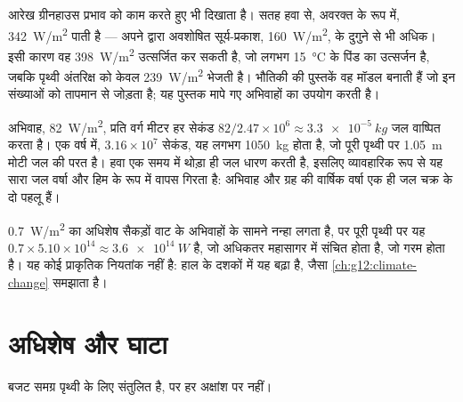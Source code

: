 आरेख ग्रीनहाउस प्रभाव को काम करते हुए भी दिखाता है। सतह हवा से, अवरक्त के रूप में,
\qty{342}{W/m^2} पाती है --- अपने द्वारा अवशोषित सूर्य-प्रकाश, \qty{160}{W/m^2}, के
दुगुने से भी अधिक। इसी कारण वह \qty{398}{W/m^2} उत्सर्जित कर सकती है, जो लगभग
\qty{15}{\degreeCelsius} के पिंड का उत्सर्जन है, जबकि पृथ्वी अंतरिक्ष को
केवल \qty{239}{W/m^2} भेजती है। भौतिकी की पुस्तकें वह मॉडल बनाती हैं जो इन संख्याओं को
तापमान से जोड़ता है; यह पुस्तक मापे गए अभिवाहों का उपयोग करती है।

\begin{example}[एक वर्ष में एक मीटर जल]\label{ex:g10:earth-energy-budget:evaporation}
 अभिवाह, \qty{82}{W/m^2}, प्रति वर्ग मीटर हर सेकंड $82/2.47\times
10^6 \approx \qty{3.3e-5}{kg}$ जल वाष्पित करता है। एक वर्ष में,
$3.16\times10^7$ सेकंड, यह लगभग \qty{1050}{kg} होता है, जो पूरी पृथ्वी पर
\qty{1.05}{m} मोटी जल की परत है। हवा एक समय में थोड़ा ही जल धारण करती है,
इसलिए व्यावहारिक रूप से यह सारा जल वर्षा और हिम के रूप में वापस गिरता है: 
अभिवाह और ग्रह की वार्षिक वर्षा एक ही जल चक्र के दो
पहलू हैं।
\end{example}

\begin{remark}[असंतुलन]\label{rem:g10:earth-energy-budget:imbalance}
\qty{0.7}{W/m^2} का अधिशेष सैकड़ों वाट के अभिवाहों के सामने नन्हा लगता है, पर पूरी पृथ्वी
पर यह $0.7 \times 5.10\times10^{14} \approx
\qty{3.6e14}{W}$ है, जो अधिकतर महासागर में संचित होता है, जो गरम होता है। यह कोई
प्राकृतिक नियतांक नहीं है: हाल के दशकों में यह बढ़ा है, जैसा
\cref{ch:g12:climate-change} समझाता है।
\end{remark}

\section{अधिशेष और घाटा}

बजट समग्र पृथ्वी के लिए संतुलित है, पर हर अक्षांश पर नहीं।

